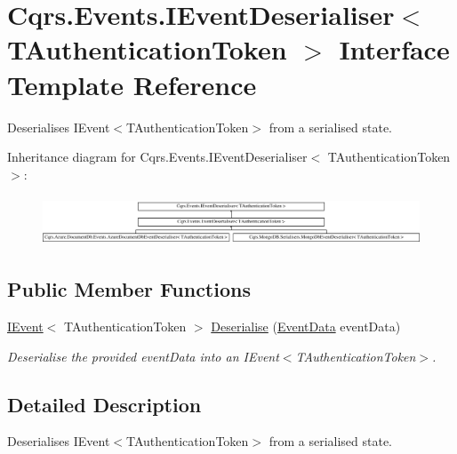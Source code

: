 \hypertarget{interfaceCqrs_1_1Events_1_1IEventDeserialiser}{}\section{Cqrs.\+Events.\+I\+Event\+Deserialiser$<$ T\+Authentication\+Token $>$ Interface Template Reference}
\label{interfaceCqrs_1_1Events_1_1IEventDeserialiser}


Deserialises I\+Event$<$\+T\+Authentication\+Token$>$ from a serialised state.  


Inheritance diagram for Cqrs.\+Events.\+I\+Event\+Deserialiser$<$ T\+Authentication\+Token $>$\+:\begin{figure}[H]
\begin{center}
\leavevmode
\includegraphics[height=1.508079cm]{interfaceCqrs_1_1Events_1_1IEventDeserialiser}
\end{center}
\end{figure}
\subsection*{Public Member Functions}
\begin{DoxyCompactItemize}
\item 
\hyperlink{interfaceCqrs_1_1Events_1_1IEvent}{I\+Event}$<$ T\+Authentication\+Token $>$ \hyperlink{interfaceCqrs_1_1Events_1_1IEventDeserialiser_af9216046631ed941bb96b58a0cc27f22_af9216046631ed941bb96b58a0cc27f22}{Deserialise} (\hyperlink{classCqrs_1_1Events_1_1EventData}{Event\+Data} event\+Data)
\begin{DoxyCompactList}\small\item\em Deserialise the provided {\itshape event\+Data}  into an I\+Event$<$\+T\+Authentication\+Token$>$. \end{DoxyCompactList}\end{DoxyCompactItemize}


\subsection{Detailed Description}
Deserialises I\+Event$<$\+T\+Authentication\+Token$>$ from a serialised state. 


